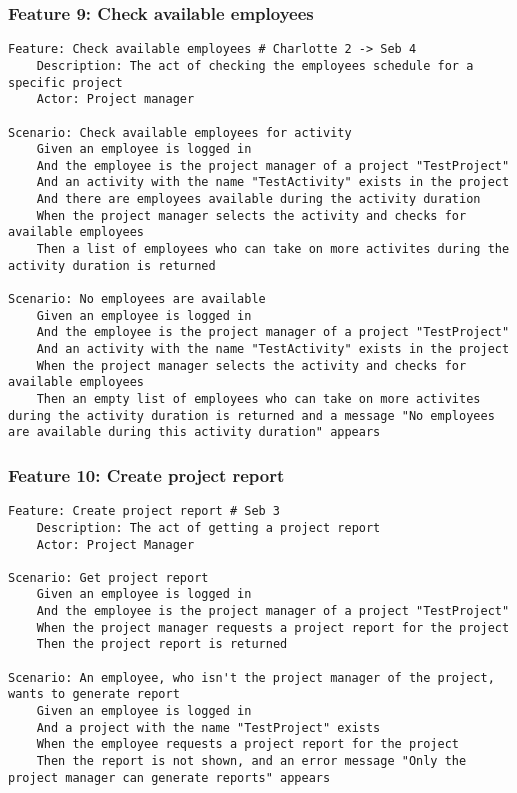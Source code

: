 \subsubsection{Feature 9: Check available employees} %
\begin{lstlisting}
Feature: Check available employees # Charlotte 2 -> Seb 4
    Description: The act of checking the employees schedule for a specific project
    Actor: Project manager

Scenario: Check available employees for activity
    Given an employee is logged in
    And the employee is the project manager of a project "TestProject"
    And an activity with the name "TestActivity" exists in the project
    And there are employees available during the activity duration
    When the project manager selects the activity and checks for available employees
    Then a list of employees who can take on more activites during the activity duration is returned

Scenario: No employees are available
    Given an employee is logged in
    And the employee is the project manager of a project "TestProject"
    And an activity with the name "TestActivity" exists in the project
    When the project manager selects the activity and checks for available employees
    Then an empty list of employees who can take on more activites during the activity duration is returned and a message "No employees are available during this activity duration" appears
\end{lstlisting}


\subsubsection{Feature 10: Create project report} %
\begin{lstlisting}
Feature: Create project report # Seb 3
    Description: The act of getting a project report
    Actor: Project Manager

Scenario: Get project report
    Given an employee is logged in
    And the employee is the project manager of a project "TestProject"
    When the project manager requests a project report for the project
    Then the project report is returned

Scenario: An employee, who isn't the project manager of the project, wants to generate report
    Given an employee is logged in
    And a project with the name "TestProject" exists
    When the employee requests a project report for the project
    Then the report is not shown, and an error message "Only the project manager can generate reports" appears
\end{lstlisting}




